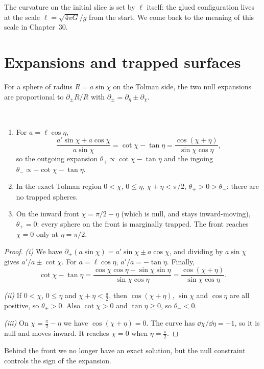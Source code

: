 The curvature on the initial slice is set by $\ell$ itself: the glued configuration lives at the scale $\ell=\sqrt{4\pi G}/g$ from the start. We come back to the meaning of this scale in Chapter~30.

\section{Expansions and trapped surfaces}

For a sphere of radius $R=a\sin\chi$ on the Tolman side, the two null expansions are proportional to $\partial_\pm R/R$ with $\partial_\pm=\partial_\eta\pm\partial_\chi$.

\begin{theorem}\label{thm:expansions}\ver\
\begin{enumerate}[label=(\roman*)]
\item For $a=\ell\cos\eta$,
\[
\frac{a'\sin\chi+a\cos\chi}{a\sin\chi}=\cot\chi-\tan\eta=\frac{\cos(\chi+\eta)}{\sin\chi\cos\eta},
\]
so the outgoing expansion $\theta_+\propto\cot\chi-\tan\eta$ and the ingoing $\theta_-\propto-\cot\chi-\tan\eta$.
\item In the exact Tolman region $0<\chi$, $0\le\eta$, $\chi+\eta<\pi/2$, $\theta_+>0>\theta_-$: there are no trapped spheres.
\item On the inward front $\chi=\pi/2-\eta$ (which is null, and stays inward-moving), $\theta_+=0$: every sphere on the front is marginally trapped. The front reaches $\chi=0$ only at $\eta=\pi/2$.
\end{enumerate}
\end{theorem}
\begin{proof}
\emph{(i)} We have $\partial_\pm(a\sin\chi)=a'\sin\chi\pm a\cos\chi$, and dividing by $a\sin\chi$ gives $a'/a\pm\cot\chi$. For $a=\ell\cos\eta$, $a'/a=-\tan\eta$. Finally,
\[
\cot\chi-\tan\eta=\frac{\cos\chi\cos\eta-\sin\chi\sin\eta}{\sin\chi\cos\eta}=\frac{\cos(\chi+\eta)}{\sin\chi\cos\eta}.
\]

\emph{(ii)} If $0<\chi$, $0\le\eta$ and $\chi+\eta<\frac\pi2$, then $\cos(\chi+\eta)$, $\sin\chi$ and $\cos\eta$ are all positive, so $\theta_+>0$. Also $\cot\chi>0$ and $\tan\eta\ge0$, so $\theta_-<0$.

\emph{(iii)} On $\chi=\frac\pi2-\eta$ we have $\cos(\chi+\eta)=0$. The curve has $\dd\chi/\dd\eta=-1$, so it is null and moves inward. It reaches $\chi=0$ when $\eta=\frac\pi2$.
\end{proof}


Behind the front we no longer have an exact solution, but the null constraint controls the sign of the expansion.

